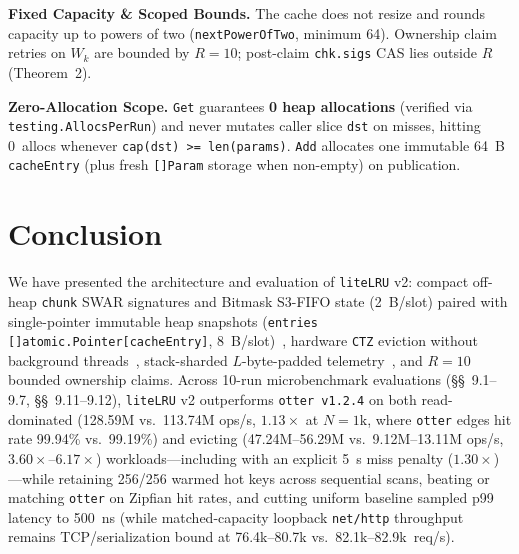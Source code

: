\documentclass[11pt,a4paper]{article}
\begin{document}
\textbf{Fixed Capacity \& Scoped Bounds.} The cache does not resize and rounds capacity up to powers of two (\texttt{nextPowerOfTwo}, minimum 64). Ownership claim retries on $W_k$ are bounded by $R=10$; post-claim \texttt{chk.sigs} CAS lies outside $R$ (Theorem~2).

\textbf{Zero-Allocation Scope.} \texttt{Get} guarantees \textbf{0 heap allocations} (verified via \texttt{testing.AllocsPerRun}) and never mutates caller slice \texttt{dst} on misses, hitting 0~allocs whenever \texttt{cap(dst) >= len(params)}. \texttt{Add} allocates one immutable 64~B \texttt{cacheEntry} (plus fresh \texttt{[]Param} storage when non-empty) on publication.

\section{Conclusion}

We have presented the architecture and evaluation of \texttt{liteLRU} v2: compact off-heap \texttt{chunk} SWAR signatures and Bitmask S3-FIFO state (2~B/slot) paired with single-pointer immutable heap snapshots (\texttt{entries []atomic.Pointer[cacheEntry]}, 8~B/slot)~\cite{gogc2018,gomem2024}, hardware \texttt{CTZ} eviction without background threads~\cite{inteltzcnt,armclz}, stack-sharded $L$-byte-padded telemetry~\cite{falsesharing1993,mesi1984}, and $R=10$ bounded ownership claims. Across 10-run microbenchmark evaluations (\S\S~9.1--9.7, \S\S~9.11--9.12), \texttt{liteLRU} v2 outperforms \texttt{otter v1.2.4} on both read-dominated (128.59M vs.\ 113.74M ops/s, $1.13\times$ at $N=1\text{k}$, where \texttt{otter} edges hit rate 99.94\% vs.\ 99.19\%) and evicting (47.24M--56.29M vs.\ 9.12M--13.11M ops/s, $3.60\times\text{--}6.17\times$) workloads---including with an explicit 5~\textmu s miss penalty ($1.30\times$)---while retaining 256/256 warmed hot keys across sequential scans, beating or matching \texttt{otter} on Zipfian hit rates, and cutting uniform baseline sampled p99 latency to 500~ns (while matched-capacity loopback \texttt{net/http} throughput remains TCP/serialization bound at 76.4k--80.7k vs.\ 82.1k--82.9k~req/s).



\end{document}
